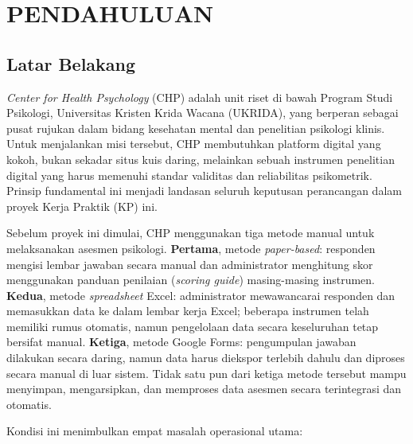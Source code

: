 \chapter{PENDAHULUAN}
\label{chap:pendahuluan}

\section{Latar Belakang}
\label{sec:latar-belakang}

\textit{Center for Health Psychology} (CHP) adalah unit riset di bawah Program Studi Psikologi, Universitas Kristen Krida Wacana (UKRIDA), yang berperan sebagai pusat rujukan dalam bidang kesehatan mental dan penelitian psikologi klinis. Untuk menjalankan misi tersebut, CHP membutuhkan platform digital yang kokoh, bukan sekadar situs kuis daring, melainkan sebuah instrumen penelitian digital yang harus memenuhi standar validitas dan reliabilitas psikometrik. Prinsip fundamental ini menjadi landasan seluruh keputusan perancangan dalam proyek Kerja Praktik (KP) ini.

Sebelum proyek ini dimulai, CHP menggunakan tiga metode manual untuk melaksanakan asesmen psikologi. \textbf{Pertama}, metode \textit{paper-based}: responden mengisi lembar jawaban secara manual dan administrator menghitung skor menggunakan panduan penilaian (\textit{scoring guide}) masing-masing instrumen. \textbf{Kedua}, metode \textit{spreadsheet} Excel: administrator mewawancarai responden dan memasukkan data ke dalam lembar kerja Excel; beberapa instrumen telah memiliki rumus otomatis, namun pengelolaan data secara keseluruhan tetap bersifat manual. \textbf{Ketiga}, metode Google Forms: pengumpulan jawaban dilakukan secara daring, namun data harus diekspor terlebih dahulu dan diproses secara manual di luar sistem. Tidak satu pun dari ketiga metode tersebut mampu menyimpan, mengarsipkan, dan memproses data asesmen secara terintegrasi dan otomatis.

Kondisi ini menimbulkan empat masalah operasional utama:

